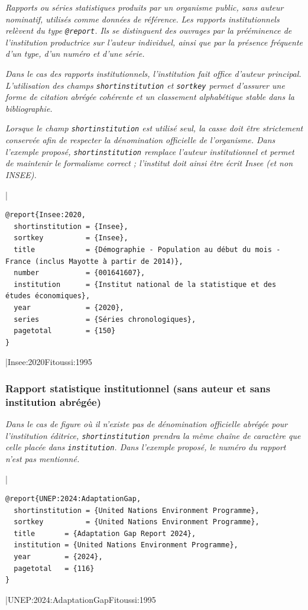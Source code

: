 \documentclass{article}
\begin{document}
\emph{Rapports ou séries statistiques produits par un organisme public, sans auteur nominatif, utilisés comme données de référence.}
\emph{Les rapports institutionnels relèvent du type \texttt{@report}. Ils se distinguent des ouvrages par la prééminence de l'institution productrice sur l'auteur individuel, ainsi que par la présence fréquente d'un type, d'un numéro et d'une série.}

\emph{Dans le cas des rapports institutionnels, l'institution fait office d'auteur principal. L'utilisation des champs \texttt{shortinstitution} et \texttt{sortkey} permet d'assurer une forme de citation abrégée cohérente et un classement alphabétique stable dans la bibliographie.}

\emph{Lorsque le champ \texttt{shortinstitution} est utilisé seul, la casse doit être strictement conservée afin de respecter la dénomination officielle de l'organisme.
Dans l'exemple proposé, \texttt{shortinstitution} remplace l'auteur institutionnel et permet de maintenir le formalisme correct ; l'institut doit ainsi être écrit Insee (et non INSEE).
}

|
\begin{verbatim}
@report{Insee:2020,
  shortinstitution = {Insee},
  sortkey          = {Insee},
  title            = {Démographie - Population au début du mois - France (inclus Mayotte à partir de 2014)},
  number           = {001641607},
  institution      = {Institut national de la statistique et des études économiques},
  year             = {2020},
  series           = {Séries chronologiques},
  pagetotal        = {150}
}
\end{verbatim}
|{Insee:2020}{Fitoussi:1995}

\subsubsection{Rapport statistique institutionnel (sans auteur et sans institution abrégée)}

\emph{Dans le cas de figure où il n'existe pas de dénomination officielle abrégée pour l'institution éditrice, \texttt{shortinstitution} prendra la même chaîne de caractère que celle placée dans \texttt{institution}.
Dans l'exemple proposé, le numéro du rapport n'est pas mentionné.}

|
\begin{verbatim}
@report{UNEP:2024:AdaptationGap,
  shortinstitution = {United Nations Environment Programme},
  sortkey          = {United Nations Environment Programme},
  title       = {Adaptation Gap Report 2024},
  institution = {United Nations Environment Programme},
  year        = {2024},
  pagetotal   = {116}
}
\end{verbatim}
|{UNEP:2024:AdaptationGap}{Fitoussi:1995}
\end{document}
